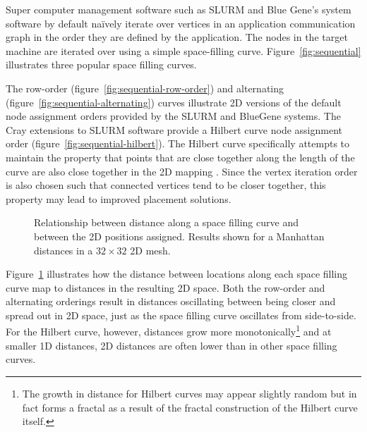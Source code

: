 				Super computer management software such as SLURM \cite{yoo03} and Blue
				Gene's system software \cite{gilge14} by default na\"ively iterate over
				vertices in an application communication graph in the order they are
				defined by the application. The nodes in the target machine are
				iterated over using a simple space-filling curve.
				Figure~\ref{fig:sequential} illustrates three popular space filling
				curves.
				
				The row-order (figure~\ref{fig:sequential-row-order}) and alternating
				(figure~\ref{fig:sequential-alternating}) curves illustrate 2D versions
				of the default node assignment orders provided by the SLURM and
				BlueGene systems.  The Cray extensions to SLURM software provide a
				Hilbert curve \cite{hilbert91} node assignment order
				(figure~\ref{fig:sequential-hilbert}). The Hilbert curve specifically
				attempts to maintain the property that points that are close together
				along the length of the curve are also close together in the 2D mapping
				\cite{moon01, zumbusch99}. Since the vertex iteration order is also
				chosen such that connected vertices tend to be closer together, this
				property may lead to improved placement solutions.
				
				\begin{figure}
					\center
					
					\caption[Relationship between space filling curve offset and 2D space.]%
					{Relationship between distance along a space filling curve
					and between the 2D positions assigned. Results shown for a
					Manhattan distances in a $32\times32$ 2D mesh.}
					\label{fig:space_filling_curves_comparison}
				\end{figure}
				
				Figure~\ref{fig:space_filling_curves_comparison} illustrates how the
				distance between locations along each space filling curve map to
				distances in the resulting 2D space. Both the row-order and alternating
				orderings result in distances oscillating between being closer and
				spread out in 2D space, just as the space filling curve oscillates from
				side-to-side. For the Hilbert curve, however, distances grow more
				monotonically\footnote{The growth in distance for Hilbert curves may
				appear slightly random but in fact forms a fractal as a result of the
				fractal construction of the Hilbert curve itself.} and at smaller 1D
				distances, 2D distances are often lower than in other space filling
				curves.
				
